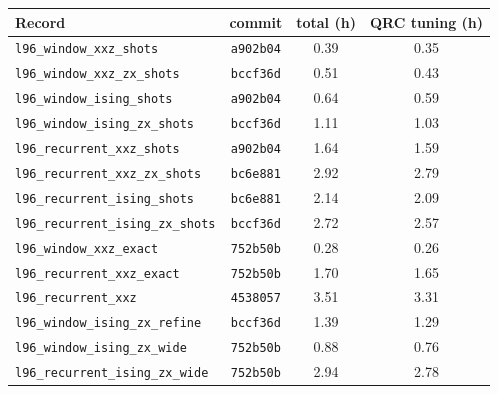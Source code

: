 \begin{tabular}{lccc}
\toprule
Record & commit & total (h) & QRC tuning (h) \\
\midrule
\texttt{l96\_window\_xxz\_shots} & \texttt{a902b04} & 0.39 & 0.35 \\
\texttt{l96\_window\_xxz\_zx\_shots} & \texttt{bccf36d} & 0.51 & 0.43 \\
\texttt{l96\_window\_ising\_shots} & \texttt{a902b04} & 0.64 & 0.59 \\
\texttt{l96\_window\_ising\_zx\_shots} & \texttt{bccf36d} & 1.11 & 1.03 \\
\texttt{l96\_recurrent\_xxz\_shots} & \texttt{a902b04} & 1.64 & 1.59 \\
\texttt{l96\_recurrent\_xxz\_zx\_shots} & \texttt{bc6e881} & 2.92 & 2.79 \\
\texttt{l96\_recurrent\_ising\_shots} & \texttt{bc6e881} & 2.14 & 2.09 \\
\texttt{l96\_recurrent\_ising\_zx\_shots} & \texttt{bccf36d} & 2.72 & 2.57 \\
\texttt{l96\_window\_xxz\_exact} & \texttt{752b50b} & 0.28 & 0.26 \\
\texttt{l96\_recurrent\_xxz\_exact} & \texttt{752b50b} & 1.70 & 1.65 \\
\texttt{l96\_recurrent\_xxz} & \texttt{4538057} & 3.51 & 3.31 \\
\texttt{l96\_window\_ising\_zx\_refine} & \texttt{bccf36d} & 1.39 & 1.29 \\
\texttt{l96\_window\_ising\_zx\_wide} & \texttt{752b50b} & 0.88 & 0.76 \\
\texttt{l96\_recurrent\_ising\_zx\_wide} & \texttt{752b50b} & 2.94 & 2.78 \\
\bottomrule
\end{tabular}
